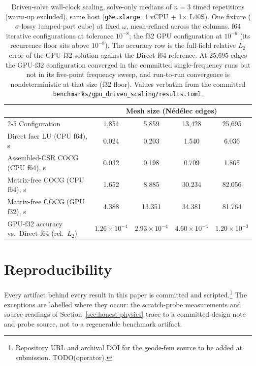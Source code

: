 \documentclass{anvil-paper}
\begin{document}
\begin{table}[t]
  \centering
  \caption{Driven-solve wall-clock scaling, solve-only medians of $n=3$
  timed repetitions (warm-up excluded), same host (\texttt{g6e.xlarge}:
  4 vCPU + 1$\times$ L40S). One fixture ($\sigma$-lossy lumped-port
  cube) at fixed $\omega$, mesh-refined across the columns. f64
  iterative configurations at tolerance $10^{-8}$; the f32 GPU
  configuration at $10^{-6}$ (its recurrence floor sits above
  $10^{-8}$). The accuracy row is the full-field relative $L_2$ error of
  the GPU-f32 solution against the Direct-f64 reference. At 25{,}695
  edges the GPU-f32 configuration converged in the committed
  single-frequency runs but not in its five-point frequency sweep, and
  run-to-run convergence is nondeterministic at that size (f32 floor).
  Values verbatim from the committed
  \texttt{benchmarks/gpu\_driven\_scaling/results.toml}.}
  \label{tab:gpu}
  \small
  \setlength{\tabcolsep}{5pt}
  \begin{tabular}{@{}lcccc@{}}
    \toprule
    & \multicolumn{4}{c}{Mesh size (N\'ed\'elec edges)} \\
    \cmidrule(l){2-5}
    Configuration & 1{,}854 & 5{,}859 & 13{,}428 & 25{,}695 \\
    \midrule
    Direct faer LU (CPU f64), s & 0.024 & 0.203 & 1.540 & 6.036 \\
    Assembled-CSR COCG (CPU f64), s & 0.032 & 0.198 & 0.709 & 1.865 \\
    Matrix-free COCG (CPU f64), s & 1.652 & 8.885 & 30.234 & 82.056 \\
    Matrix-free COCG (GPU f32), s & 4.388 & 13.351 & 34.381 & 81.764 \\
    \midrule
    GPU-f32 accuracy vs.\ Direct-f64 (rel.\ $L_2$) &
      $1.26\times10^{-4}$ & $2.93\times10^{-4}$ &
      $4.60\times10^{-4}$ & $1.20\times10^{-3}$ \\
    \bottomrule
  \end{tabular}
\end{table}

\section{Reproducibility}
\label{sec:repro}

Every artifact behind every result in this paper is committed and
scripted.\footnote{Repository URL and archival DOI for the geode-fem
source to be added at submission. TODO(operator).}
The exceptions are labelled where they occur: the scratch-probe
measurements and source readings of Section~\ref{sec:honest-physics}
trace to a committed design note and probe source, not to a regenerable
benchmark artifact.
\end{document}
